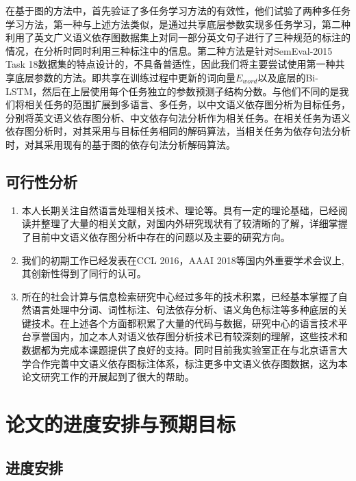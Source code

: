 在基于图的方法中，首先验证了多任务学习方法的有效性，他们试验了两种多任务学习方法，第一种与上述方法类似，是通过共享底层参数实现多任务学习，第二种利用了英文广义语义依存图数据集上对同一部分英文句子进行了三种规范的标注的情况，在分析时同时利用三种标注中的信息。第二种方法是针对SemEval-2015 Task 18数据集的特点设计的，不具备普适性，因此我们将主要尝试使用第一种共享底层参数的方法。即共享在训练过程中更新的词向量$E_{word}$以及底层的Bi-LSTM，然后在上层使用每个任务独立的参数预测子结构分数。与他们不同的是我们将相关任务的范围扩展到多语言、多任务，以中文语义依存图分析为目标任务，分别将英文语义依存图分析、中文依存句法分析作为相关任务。在相关任务为语义依存图分析时，对其采用与目标任务相同的解码算法，当相关任务为依存句法分析时，对其采用现有的基于图的依存句法分析解码算法。

\subsection{可行性分析}
\begin{enumerate}
	\item 本人长期关注自然语言处理相关技术、理论等。具有一定的理论基础，已经阅读并整理了大量的相关文献，对国内外研究现状有了较清晰的了解，详细掌握了目前中文语义依存图分析中存在的问题以及主要的研究方向。
	
	\item 我们的初期工作已经发表在CCL 2016，AAAI 2018等国内外重要学术会议上,其创新性得到了同行的认可。
	
	\item 所在的社会计算与信息检索研究中心经过多年的技术积累，已经基本掌握了自然语言处理中分词、词性标注、句法依存分析、语义角色标注等多种底层的关键技术。在上述各个方面都积累了大量的代码与数据，研究中心的语言技术平台享誉国内，加之本人对语义依存图分析技术已有较深刻的理解，这些技术和数据都为完成本课题提供了良好的支持。同时目前我实验室正在与北京语言大学合作完善中文语义依存图标注体系，标注更多中文语义依存图数据，这为本论文研究工作的开展起到了很大的帮助。
	
	
\end{enumerate}
\section{论文的进度安排与预期目标}

\subsection{进度安排}

